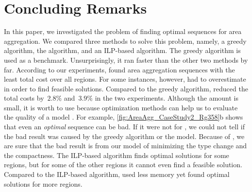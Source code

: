\documentclass[acmsmall,natbib=false]{acmart}
\begin{document}


\section{Concluding Remarks}
\label{sec:AreaAgg_Conclusions}
In this paper, we investigated the problem of 
finding optimal sequences for area aggregation.
We compared three methods to solve this problem, namely, 
a greedy algorithm, the \Astar algorithm, and an ILP-based algorithm.
The greedy algorithm is used as a benchmark.
Unsurprisingly, it ran faster than the other two methods by far.
According to our experiments, \Astar found area aggregation sequences
with the least total cost over all regions.
For some instances, however, \Astar had to overestimate
in order to find feasible solutions.
Compared to the greedy algorithm, 
\Astar reduced the total costs by~$2.8\%$ and~$3.9\%$
in the two experiments.
Although the amount is small, it is worth to use \Astar
because optimization methods can help us 
to evaluate the quality of a model 
\parencite{Haunert2017Label,Haunert2008Assuring,Haunert2016Optimization}.
For example, \fig\ref{fig:AreaAgg_CaseStudy2_Rg358}b shows that
even an \emph{optimal} sequence can be bad.
If it were not for \Astar, 
we could not tell if the bad result was caused 
by the greedy algorithm or  the model.
Because of \Astar, we are sure that the bad result is from
our model of minimizing the 
type change and the compactness.
The ILP-based algorithm finds optimal solutions for some regions,
but for some of the other regions 
it cannot even find a feasible solution.
Compared to the ILP-based algorithm,
\Astar used less memory 
yet found optimal solutions for more regions.

\end{document}
